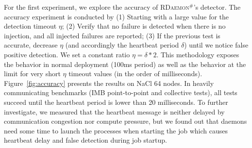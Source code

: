 \documentclass[5p,times,twocolumn]{elsarticle}
\newcommand{\ourwork}[0]{\textsc{RDaemon}\ensuremath{^\#}\xspace}
\newcommand{\imb}[0]{\textsc{IMB}\xspace}
\begin{document}
For the first experiment, we explore the accuracy of \ourwork's detector.
%
The accuracy experiment is conducted by (1) Starting with a large value for the
detection timeout $\eta$; (2) Verify that no failure is detected when there is no injection, and all injected failures are reported; (3) If the previous test is accurate, decrease $\eta$ (and accordingly the heartbeat period $\delta$) until we notice false positive detection. We set a constant ratio $\eta = \delta * 2$.
This methodology exposes the behavior in normal deployment (100ms period) as well
as the behavior at the limit for very short $\eta$ timeout values (in the order of milliseconds).
 Figure~\ref{fig:accuracy} presents the results on NaCl 64 nodes.
 In heavily communicating benchmarks
 (\imb point-to-point and collective tests), all tests succeed until the
  heartbeat period is lower than 20 milliseconds. To further investigate,
  we measured that the heartbeat message is neither delayed by communication
  congestion nor compute pressure, but we found out that daemons need some time to launch the processes when starting the job which causes heartbeat delay and false detection during job startup.


\end{document}
